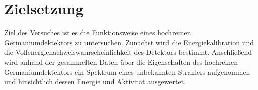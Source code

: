 \section{Zielsetzung}
\label{sec:zielsetzung}

Ziel des Versuches ist es die Funktionsweise eines hochreinen Germaniumdektektors zu untersuchen.
Zunächst wird die Energiekalibration und die Vollenergienachweiswahrscheinlichkeit des Detektors
bestimmt.
Anschließend wird anhand der gesammelten Daten über die Eigenschaften des hochreinen Germaniumdektektors
ein Spektrum eines unbekannten Strahlers aufgenommen und hinsichtlich dessen Energie und Aktivität ausgewertet.